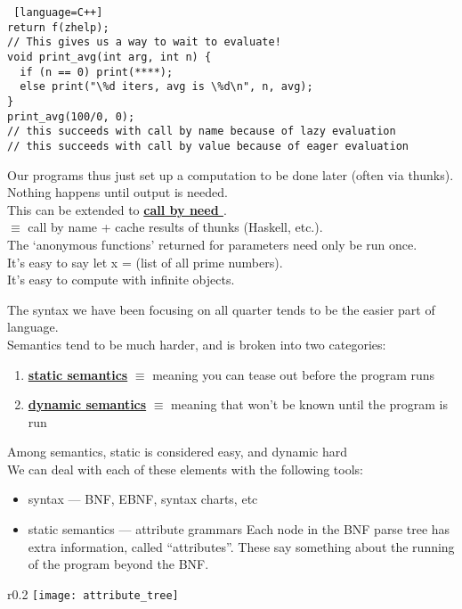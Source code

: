 \documentclass[../../lecture_notes.tex]{subfiles}
\begin{document}
\begin{enumerate} [itemsep=0mm]
\begin{lstlisting} [language=C++]
return f(zhelp);
// This gives us a way to wait to evaluate!
void print_avg(int arg, int n) {
  if (n == 0) print(****);
  else print("\%d iters, avg is \%d\n", n, avg);
}
print_avg(100/0, 0); 
// this succeeds with call by name because of lazy evaluation
// this succeeds with call by value because of eager evaluation
		\end{lstlisting}
		Our programs thus just set up a computation to be done later (often via thunks).\\
		Nothing happens until output is needed.\\
		This can be extended to \textbf{\underline{call by need }}.\\
		$\equiv$ call by name + cache results of thunks (Haskell, etc.).\\
		The ‘anonymous functions’ returned for parameters need only be run once.\\
		It’s easy to say let x = (list of all prime numbers).\\
		It’s easy to compute with infinite objects.\\
\end{enumerate} \smallskip

The syntax we have been focusing on all quarter tends to be the easier part of language.\\
Semantics tend to be much harder, and is broken into two categories: \begin{enumerate} [itemsep=0mm]
	\item \textbf{\underline{static semantics}} $\equiv$ meaning you can tease out before the program runs
	\item \textbf{\underline{dynamic semantics}} $\equiv$ meaning that won’t be known until the program is run
\end{enumerate}
\noindent Among semantics, static is considered easy, and dynamic hard
\\
We can deal with each of these elements with the following tools:
\begin{itemize} [itemsep=0mm]
	\item syntax — BNF, EBNF, syntax charts, etc
	\item static semantics — attribute grammars
		Each node in the BNF parse tree has extra information, called “attributes”.
		These say something about the running of the program beyond the BNF.
\end{itemize}

\begin{wrapfigure}{r}{0.2\textwidth}
	\texttt{[image: attribute\_tree]}
	\label{fig:test}
\end{wrapfigure}
\end{document}
